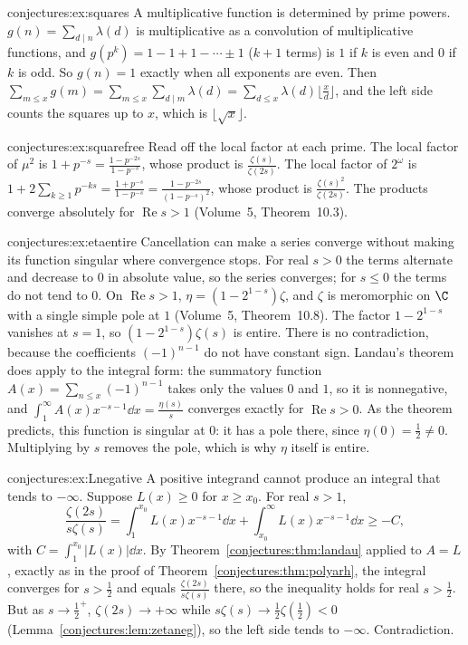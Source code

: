 \begin{solution}{conjectures:ex:squares}
\idea A multiplicative function is determined by prime powers.
\writeup $g(n)=\sum_{d\mid n}\lambda(d)$ is multiplicative as a convolution of multiplicative functions, and $g(p^k)=1-1+1-\cdots\pm1$ ($k+1$ terms) is $1$ if $k$ is
even and $0$ if $k$ is odd. So $g(n)=1$ exactly when all exponents are even. Then $\sum_{m\le x}g(m)=\sum_{m\le x}\sum_{d\mid m}\lambda(d)=\sum_{d\le x}\lambda(d)\lfloor\frac xd\rfloor$,
and the left side counts the squares up to $x$, which is $\lfloor\sqrt x\rfloor$.
\end{solution}

\begin{solution}{conjectures:ex:squarefree}
\idea Read off the local factor at each prime.
\writeup The local factor of $\mu^2$ is $1+p^{-s}=\frac{1-p^{-2s}}{1-p^{-s}}$, whose product is $\frac{\zeta(s)}{\zeta(2s)}$. The local factor of $2^\omega$ is
$1+2\sum_{k\ge1}p^{-ks}=\frac{1+p^{-s}}{1-p^{-s}}=\frac{1-p^{-2s}}{(1-p^{-s})^2}$, whose product is $\frac{\zeta(s)^2}{\zeta(2s)}$. The products converge absolutely for
$\operatorname{Re}s>1$ (Volume~5, Theorem~10.3).
\end{solution}

\begin{solution}{conjectures:ex:etaentire}
\idea Cancellation can make a series converge without making its function singular where convergence stops.
\writeup For real $s>0$ the terms alternate and decrease to $0$ in absolute value, so the series converges; for $s\le0$ the terms do not tend to $0$. On
$\operatorname{Re}s>1$, $\eta=(1-2^{1-s})\zeta$, and $\zeta$ is meromorphic on $\C$ with a single simple pole at $1$ (Volume~5, Theorem~10.8). The factor $1-2^{1-s}$
vanishes at $s=1$, so $(1-2^{1-s})\zeta(s)$ is entire. There is no contradiction, because the coefficients $(-1)^{n-1}$ do not have constant sign. Landau's theorem
does apply to the integral form: the summatory function $A(x)=\sum_{n\le x}(-1)^{n-1}$ takes only the values $0$ and $1$, so it is nonnegative, and
$\int_1^\infty A(x)x^{-s-1}\dd x=\frac{\eta(s)}s$ converges exactly for $\operatorname{Re}s>0$. As the theorem predicts, this function is singular at $0$: it has a
pole there, since $\eta(0)=\frac12\ne0$. Multiplying by $s$ removes the pole, which is why $\eta$ itself is entire.
\end{solution}

\begin{solution}{conjectures:ex:Lnegative}
\idea A positive integrand cannot produce an integral that tends to $-\infty$.
\writeup Suppose $L(x)\ge0$ for $x\ge x_0$. For real $s>1$,
\[
\frac{\zeta(2s)}{s\zeta(s)}=\int_1^{x_0}L(x)x^{-s-1}\dd x+\int_{x_0}^\infty L(x)x^{-s-1}\dd x\ge-C,
\]
with $C=\int_1^{x_0}|L(x)|\dd x$. By Theorem~\ref{conjectures:thm:landau} applied to $A=L$, exactly as in the proof of Theorem~\ref{conjectures:thm:polyarh}, the integral converges for
$s>\frac12$ and equals $\frac{\zeta(2s)}{s\zeta(s)}$ there, so the inequality holds for real $s>\frac12$. But as $s\to\frac12^+$, $\zeta(2s)\to+\infty$ while
$s\zeta(s)\to\frac12\zeta(\frac12)<0$ (Lemma~\ref{conjectures:lem:zetaneg}), so the left side tends to $-\infty$. Contradiction.
\end{solution}

